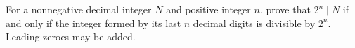 For a nonnegative decimal integer $N$ and positive integer $n$, prove that $2^n\mid N$ if and only if the integer formed by its last $n$ decimal digits is divisible by $2^n$. Leading zeroes may be added.
